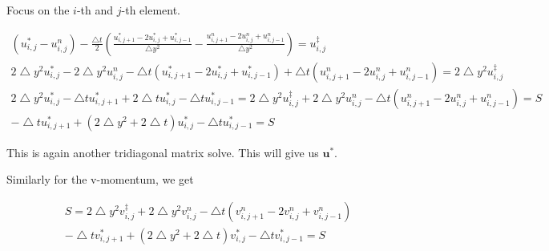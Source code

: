 \documentclass[12pt]{article}
\begin{document}
Focus on the $i$-th and $j$-th element.

\begin{align*}
    (u^*_{i,j} - u^n_{i,j}) - \frac{\bigtriangleup t}{2}(\frac{u^*_{i,j+1} - 2u^*_{i,j} + u^*_{i,j-1}}{\bigtriangleup y^2} - \frac{u^n_{i,j+1} - 2u^n_{i,j} + u^n_{i,j-1}}{\bigtriangleup y^2}) = u^\ddagger_{i,j} \\
    2\bigtriangleup y^2 u^*_{i,j} - 2\bigtriangleup y^2 u^n_{i,j} - \bigtriangleup t(u^*_{i,j+1} - 2u^*_{i,j} + u^*_{i,j-1}) + \bigtriangleup t(u^n_{i,j+1} - 2u^n_{i,j} + u^n_{i,j-1}) = 2\bigtriangleup y^2 u^\ddagger_{i,j} \\
    2\bigtriangleup y^2 u^*_{i,j} - \bigtriangleup t u^*_{i,j+1} + 2\bigtriangleup t u^*_{i,j} - \bigtriangleup t u^*_{i,j-1} = 2\bigtriangleup y^2 u^\ddagger_{i,j} + 2\bigtriangleup y^2 u^n_{i,j} - \bigtriangleup t(u^n_{i,j+1} - 2u^n_{i,j} + u^n_{i,j-1}) = S \\
    -\bigtriangleup t u^*_{i,j+1} + (2\bigtriangleup y^2 + 2\bigtriangleup t)u^*_{i,j} - \bigtriangleup t u^*_{i,j-1} = S
\end{align*}

This is again another tridiagonal matrix solve. This will give us $\mathbf{u}^*$.

Similarly for the v-momentum, we get

\begin{align}
S = 2\bigtriangleup y^2 v^\ddagger_{i,j} + 2\bigtriangleup y^2 v^n_{i,j} - \bigtriangleup t(v^n_{i,j+1} - 2v^n_{i,j} + v^n_{i,j-1}) \\
-\bigtriangleup t v^*_{i,j+1} + (2\bigtriangleup y^2 + 2\bigtriangleup t)v^*_{i,j} - \bigtriangleup t v^*_{i,j-1} = S
\end{align}
\end{document}
